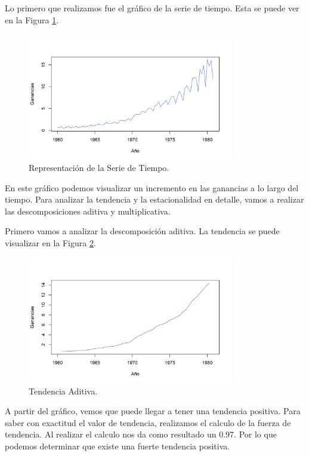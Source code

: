 \documentclass{article} %
\begin{document}
Lo primero que realizamos fue el gráfico de la serie de tiempo. Esta se puede ver en la Figura \ref{fig:SerieOriginal}.

\begin{figure}[H]
	\centering
	\includegraphics[width=0.8\textwidth]{images/4-1 Serie Original}
	\caption{Representación de la Serie de Tiempo.}
	\label{fig:SerieOriginal}
\end{figure} 

En este gráfico podemos visualizar un incremento en las ganancias a lo largo del tiempo. Para analizar la tendencia y la estacionalidad en detalle, vamos a realizar las descomposiciones aditiva y multiplicativa. 

Primero vamos a analizar la descomposición aditiva. La tendencia se puede visualizar en la Figura \ref{fig:TendenciaAditiva}.

\begin{figure}[H]
	\centering
	\includegraphics[width=0.8\textwidth]{images/4-2 Tendencia Aditiva}
	\caption{Tendencia Aditiva.}
	\label{fig:TendenciaAditiva}
\end{figure} 

A partir del gráfico, vemos que puede llegar a tener una tendencia positiva. Para saber con exactitud el valor de tendencia, realizamos el calculo de la fuerza de tendencia. Al realizar el calculo nos da como resultado un 0.97. Por lo que podemos determinar que existe una fuerte tendencia positiva.
\end{document}
